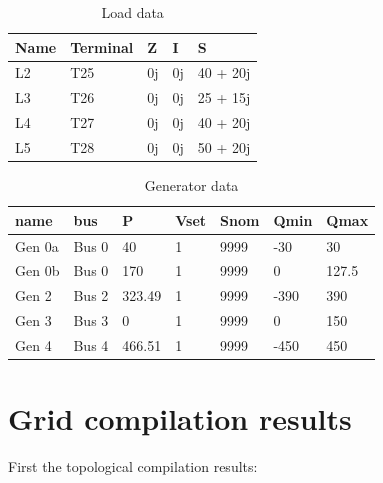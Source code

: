 \documentclass[nols,a4paper,twoside,notoc,fleqn]{tufte-book}
\begin{document}
\begin{table}[ht]
	\begin{tabular}{|l|l|l|l|l|}
		\hline
		\rowcolor{maincolor}
		{\color{white}Name} & {\color{white}Terminal}    & {\color{white}Z}  & {\color{white}I}  & {\color{white}S}         \\ \hline
		L2 & T25 &  0j & 0j & 40 + 20j   \\ \hline
		L3 & T26 &  0j & 0j & 25 + 15j   \\ \hline
		L4 & T27 &  0j & 0j & 40 + 20j \\ \hline
		L5 & T28 &  0j & 0j & 50 + 20j \\ \hline
	\end{tabular}
	\caption{Load data}
	\label{tbl:IEEE5:load_data}
\end{table}


\begin{table}[ht]
	\begin{tabular}{|l|l|l|l|l|l|l|}
		\hline
		\rowcolor{maincolor}
		{\color{white}name}       & {\color{white}bus}      & {\color{white}P}      & {\color{white}Vset} & {\color{white}Snom} & {\color{white}Qmin} & {\color{white}Qmax}  \\ \hline
		Gen 0a & Bus 0  & 40     & 1    & 9999 & -30  & 30    \\ \hline
		Gen 0b & Bus 0  & 170    & 1    & 9999 & 0    & 127.5 \\ \hline
		Gen 2 & Bus 2  & 323.49 & 1    & 9999 & -390 & 390   \\ \hline
		Gen 3 & Bus 3  & 0      & 1    & 9999 & 0    & 150   \\ \hline
		Gen 4 & Bus 4  & 466.51 & 1    & 9999 & -450 & 450   \\ \hline
	\end{tabular}
	\caption{Generator data}
	\label{tbl:IEEE5:gen_data}
\end{table}





\newpage
\section{Grid compilation results}

First the topological compilation results:
\end{document}
